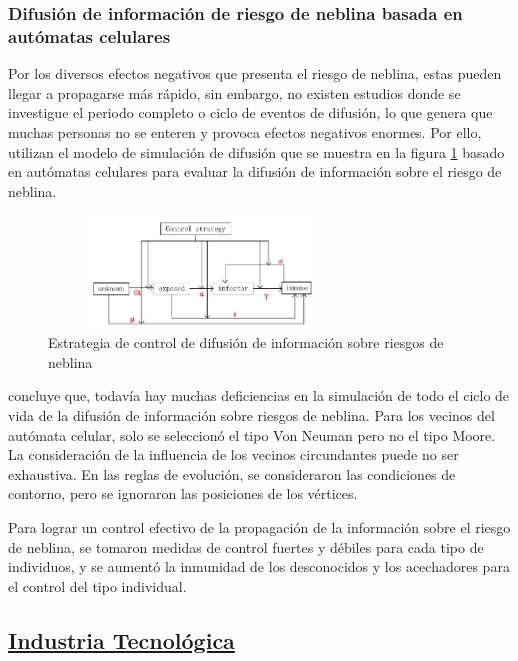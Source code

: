 \documentclass[10pt,conference]{IEEEtran}
\begin{document}
\subsubsection{\textbf{Difusión de información de riesgo de neblina basada en autómatas celulares}}
Por los diversos efectos negativos que presenta el riesgo de neblina, estas pueden llegar a propagarse más rápido, sin embargo, no existen estudios donde se investigue el periodo completo o ciclo de eventos de difusión, lo que genera que muchas personas no se enteren y provoca efectos negativos enormes. 
Por ello,  utilizan el modelo de simulación de difusión que se muestra en la figura \ref{Amb-5} basado en autómatas celulares para evaluar la difusión de información sobre el riesgo de neblina.
\begin{figure}[H]
 \begin{center}
       \includegraphics[width=
       8cm, height=3cm]{Ind. Ambiental/5.JPG}
      \caption{Estrategia de control de difusión de información sobre riesgos de neblina}
      \label{Amb-5} 
      \end{center}
\end{figure}
 concluye que, todavía hay muchas deficiencias en la simulación de todo el ciclo de vida de la difusión de información sobre riesgos de neblina. Para los vecinos del autómata celular, solo se seleccionó el tipo Von Neuman pero no el tipo Moore. La consideración de la influencia de los vecinos circundantes puede no ser exhaustiva. En las reglas de evolución, se consideraron las condiciones de contorno, pero se ignoraron las posiciones de los vértices.\par
Para lograr un control efectivo de la propagación de la información sobre el riesgo de neblina, se tomaron medidas de control fuertes y débiles para cada tipo de individuos, y se aumentó la inmunidad de los desconocidos y los acechadores para el control del tipo individual.
\vspace{2.5mm}
\subsection{\underline{\textbf{Industria Tecnológica}}}
\vspace{2.5mm}
\end{document}
